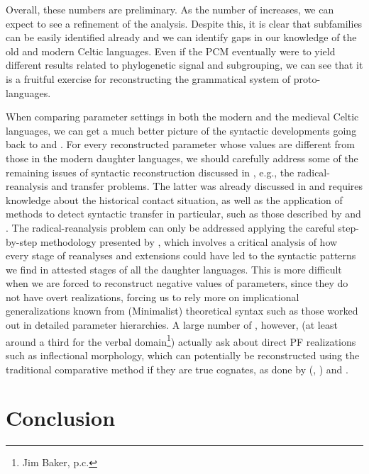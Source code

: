\documentclass[output=paper,colorlinks,citecolor=brown]{langscibook}
\begin{document}
Overall, these numbers are preliminary. As the number of  increases, we can expect to see a refinement of the analysis. Despite this, it is clear that  subfamilies can be easily identified already and we can identify gaps in our knowledge of the old and modern Celtic languages. Even if the PCM eventually were to yield different results related to phylogenetic signal and subgrouping, we can see that it is a fruitful exercise for reconstructing the grammatical system of proto\hyp languages.

When comparing parameter settings in both the modern and the medieval Celtic languages, we can get a much better picture of the syntactic developments going back to  and . For every reconstructed parameter whose values are different from those in the modern daughter languages, we should carefully address some of the remaining issues of syntactic reconstruction discussed in , e.g., the radical-reanalysis and transfer problems. The latter was already discussed in  and requires knowledge about the historical contact situation, as well as the application of methods to detect syntactic transfer in particular, such as those described by \citet{mm:bowern_syntactic_2008} and \citet{mm:daniels_method_2017}. The radical-reanalysis problem can only be addressed applying the careful step-by-step methodology presented by \citet{mm:willis_negation_2006}, which involves a critical analysis of how every stage of reanalyses and extensions could have led to the syntactic patterns we find in attested stages of all the daughter languages. This is more difficult when we are forced to reconstruct negative values of parameters, since they do not have overt realizations, forcing us to rely more on implicational generalizations known from (Minimalist) theoretical syntax such as those worked out in detailed parameter hierarchies. A large number of , however, (at least around a third for the verbal domain\footnote{Jim Baker, p.c.}) actually ask about direct PF realizations such as inflectional morphology, which can potentially be reconstructed using the traditional comparative method if they are true cognates, as done by \citeauthor{mm:walkden_abduction_2011} (\citeyear{mm:walkden_abduction_2011}, \citeyear{mm:Walkden2014}) and \citet{mm:willis_reconstructing_2011}. 

\section{Conclusion}
\largerpage[2]
\end{document}
